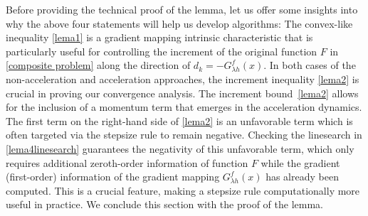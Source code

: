 \documentclass[11pt, a4paper, oneside, reqno]{amsart}
\begin{document}
Before providing the technical proof of the lemma, let us offer some insights into why the above four statements will help us develop algorithms: 
The convex-like inequality \ref{lema1} is a gradient mapping intrinsic characteristic that is particularly useful for controlling the increment of the original function $F$ in \eqref{composite problem} along the direction of $d_k = -G^{f}_{\lambda h}(x)$. In both cases of the non-acceleration and acceleration approaches, the increment inequality \ref{lema2} is crucial in proving our convergence analysis. The increment bound~\ref{lema2} allows for the inclusion of a momentum term that emerges in the acceleration dynamics. The first term on the right-hand side of \ref{lema2} is an unfavorable term which is often targeted via the stepsize rule to remain negative. Checking the linesearch in \ref{lema4linesearch} guarantees the negativity of this unfavorable term, which only requires additional zeroth-order information of function $F$ while the gradient (first-order) information of the gradient mapping $G^{f}_{\lambda h}(x)$ has already been computed. This is a crucial feature, making a stepsize rule computationally more useful in practice. We conclude this section with the proof of the lemma.
\end{document}

